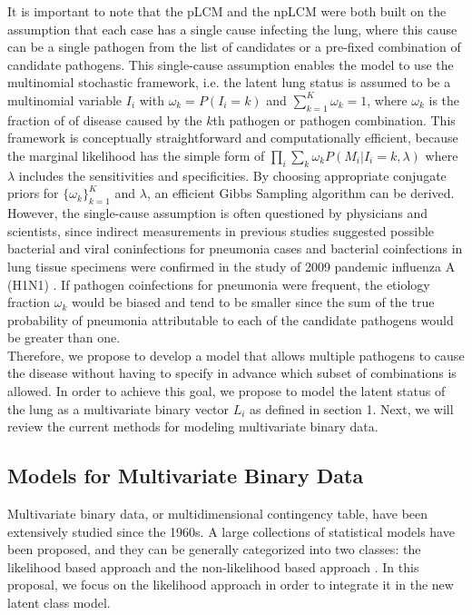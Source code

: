 \documentclass[11 pt, a4paper]{article}  %
\begin{document}
It is important to note that the pLCM and the npLCM were both built on the assumption that each case has a single cause infecting the lung, where this cause can be a single pathogen from the list of candidates or a pre-fixed combination of candidate pathogens. This single-cause assumption enables the model to use the multinomial stochastic framework, i.e. the latent lung status is assumed to be a multinomial variable $I_i$ with $\omega_k=P(I_i=k)$ and $\sum_{k=1}^K \omega_k=1$, where $\omega_k$ is the fraction of of disease caused by the $k$th pathogen or pathogen combination. This framework is conceptually straightforward and computationally efficient, because the marginal likelihood has the simple form of $\prod_i \sum_k \omega_k P(M_{i}|I_i=k,\lambda)$ where $\lambda$ includes the sensitivities and specificities. By choosing appropriate conjugate priors for $\{\omega_k\}_{k=1}^K$ and $\lambda$, an efficient Gibbs Sampling algorithm can be derived. \\

However, the single-cause assumption is often questioned by physicians and scientists, since indirect measurements in previous studies \cite{cilla2008viruses, toikka2000streptococcus} suggested possible bacterial and viral coninfections for pneumonia cases and bacterial coinfections in lung tissue specimens were confirmed in the study of 2009 pandemic influenza A (H1N1) \cite{louie2009bacterial}. If pathogen coinfections for pneumonia were frequent, the etiology fraction $\omega_k$ would be biased and tend to be smaller since the sum of the true probability of pneumonia attributable to each of the candidate pathogens would be greater than one. \\

Therefore, we propose to develop a model that allows multiple pathogens to cause the disease without having to specify in advance which subset of combinations is allowed. In order to achieve this goal, we propose to model the latent status of the lung as a multivariate binary vector $L_i$ as defined in section 1. Next, we will review the current methods for modeling multivariate binary data.\\


\subsection{Models for Multivariate Binary Data}
Multivariate binary data, or multidimensional contingency table, have been extensively studied since the 1960s. A large collections of statistical models have been proposed, and they can be generally categorized into two classes: the likelihood based approach \cite{haberman1973log, fitzmaurice1993likelihood, ekholm1995marginal, zhao1990correlated} and the non-likelihood based approach \cite{liang1986longitudinal, zeger1988models, lipsitz1991generalized}. In this proposal, we focus on the likelihood approach in order to integrate it in the new latent class model.\\
\end{document}
